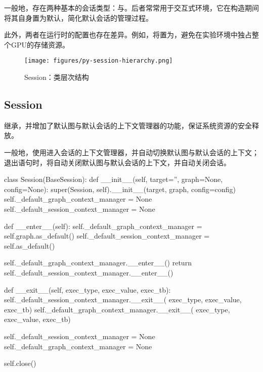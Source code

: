 \begin{content}

一般地，存在两种基本的会话类型：与。后者常常用于交互式环境，它在构造期间将其自身置为默认，简化默认会话的管理过程。

此外，两者在运行时的配置也存在差异。例如，将置为，避免在实验环境中独占整个GPU的存储资源。

\begin{figure}[!htbp]
\centering
\texttt{[image: figures/py-session-hierarchy.png]}
\caption{Session：类层次结构}
 \label{fig:py-session-hierarchy}
\end{figure}

\subsection{Session}

继承，并增加了默认图与默认会话的上下文管理器的功能，保证系统资源的安全释放。

一般地，使用进入会话的上下文管理器，并自动切换默认图与默认会话的上下文；退出语句时，将自动关闭默认图与默认会话的上下文，并自动关闭会话。

\begin{leftbar}
\begin{python}
class Session(BaseSession):
  def __init__(self, target='', graph=None, config=None):
    super(Session, self).__init__(target, graph, config=config)
    self._default_graph_context_manager = None
    self._default_session_context_manager = None

  def __enter__(self):
    self._default_graph_context_manager = self.graph.as_default()
    self._default_session_context_manager = self.as_default()

    self._default_graph_context_manager.__enter__()
    return self._default_session_context_manager.__enter__()

  def __exit__(self, exec_type, exec_value, exec_tb):
    self._default_session_context_manager.__exit__(
        exec_type, exec_value, exec_tb)
    self._default_graph_context_manager.__exit__(
        exec_type, exec_value, exec_tb)

    self._default_session_context_manager = None
    self._default_graph_context_manager = None

    self.close()
\end{python}
\end{leftbar}


\end{content}
